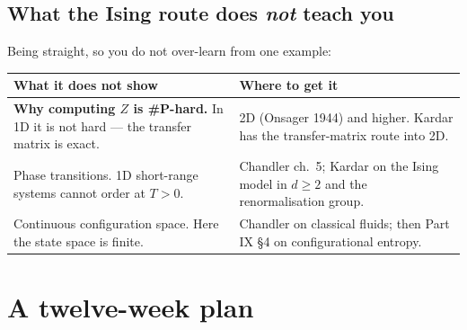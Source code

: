 \subsection{What the Ising route does \emph{not} teach you}

Being straight, so you do not over-learn from one example:

\begin{center}\small
\begin{tabular}{@{}>{\raggedright\arraybackslash}p{7.6cm}>{\raggedright\arraybackslash}p{8.9cm}@{}}
\toprule
\rowcolor{alert!10}
\textbf{\color{alert}What it does not show} & \textbf{\color{alert}Where to get it}\\
\midrule
\textbf{Why computing $Z$ is \#P-hard.} In 1D it is not hard --- the transfer matrix is exact. &
 2D (Onsager 1944) and higher. Kardar has the transfer-matrix route into 2D.\\
Phase transitions. 1D short-range systems cannot order at $T>0$. & Chandler ch.\ 5; Kardar on the
 Ising model in $d\ge2$ and the renormalisation group.\\
Continuous configuration space. Here the state space is finite. & Chandler on classical fluids;
 then Part IX §4 on configurational entropy.\\
\bottomrule
\end{tabular}
\end{center}

\clearpage
\section{A twelve-week plan}

